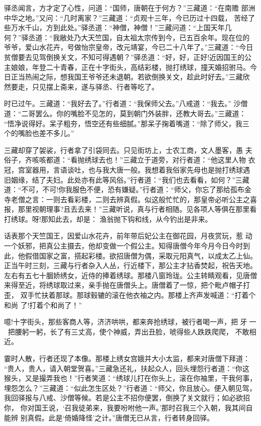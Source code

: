 驿丞闻言，方才定了心性，问道：“国师，唐朝在于何方？”三藏道：“在南赡
部洲中华之地。”又问：“几时离家？”三藏道：“贞观十三年，今已历过十四载，
苦经了些万水千山，方到此处。”驿丞道：“神僧，神僧！”三藏问道：“上国天年几
何？”驿丞道：“我敝处乃大天竺国，自太祖太宗传到今，已五百余年。现在位的
爷爷，爱山水花卉，号做怡宗皇帝，改元靖宴，今已二十八年了。”三藏道：“今日
贫僧要去见驾倒换关文，不知可得遇朝？”驿丞道：“好，好，正好!近因国王的公
主娘娘，年登二十青春，正在十字街头，高结彩楼，抛打绣球，撞天婚招驸马。今
日正当热闹之际，想我国王爷爷还未退朝。若欲倒换关文，趁此时好去。”三藏欣
然要走，只见摆上斋来，遂与驿丞、行者等吃了。

时已过午。三藏道：“我好去了。”行者道：“我保师父去。”八戒道：“我去。”
沙僧道：“二哥罢么。你的嘴脸不见怎的，莫到朝门外装胖，还教大哥去。”三藏道：
“悟净说得好。呆子粗夯，悟空还有些细腻。”那呆子掬着嘴道：“除了师父，我三
个的嘴脸也差不多儿。”

三藏却穿了袈裟，行者拿了引袋同去。只见街坊上，士农工商，文人墨客，愚
夫俗子，齐咳咳都道：“看抛绣球去也！”三藏立于道旁，对行者道：“他这里人物
衣冠，宫室器用，言语谈吐，也与我大唐一般。我想着我俗家先母也是抛打绣球遇
旧姻缘，结了夫妇。此处亦有此等风俗。”行者道：“我们也去看看，如何？”三藏
道：“不可，不可!你我服色不便，恐有嫌疑。”行者道：“师父，你忘了那给孤布金
寺老僧之言：一则去看彩楼，二则去辨真假。似这般忙忙的，那皇帝必听公主之喜
报，那里视朝理事?且去去来！”三藏听说，真与行者相随。见各项人等俱在那里看
打绣球。呀!那知此去，却是：
渔翁抛下钩和线，从今钓出是非来。

话表那个天竺国王，因爱山水花卉，前年带后妃公主在御花园，月夜赏玩，惹
动一个妖邪，把真公主摄去，他却变做一个假公主。知得唐僧今年今月今日今时到
此，他假借国家之富，搭起彩楼。欲招唐僧为偶，采取元阳真气，以成太乙上仙。
正当午时三刻，三藏与行者杂入人丛，行近楼下，那公主才拈香焚起，祝告天地。
左右有五七十胭娇绣女，近侍的捧着绣球。那楼八窗玲珑。公主转睛观看，见唐僧
来得至近，将绣球取过来，亲手抛在唐僧头上。唐僧着了一惊，把个毗卢帽子打歪，
双手忙扶着那球。那球毂辘的滚在他衣袖之内。那楼上齐声发喊道：“打着个和尚
了!打着个和尚了！”

噫!十字街头，那些客商人等，济济哄哄，都来奔抢绣球，被行者喝一声，把
牙一，把腰躬一躬，长了有三丈高，使个神威，弄出丑脸，唬得些人跌跌爬爬，
不敢相近。

霎时人散，行者还现了本像。那楼上绣女宫娥并大小太监，都来对唐僧下拜道：
“贵人，贵人，请入朝堂贺喜。”三藏急还礼，扶起众人，回头埋怨行者道：“你这
猴头，又是撮弄我也！”行者笑道：“绣球儿打在你头上，滚在你袖里，干我何事，
埋怨怎么？”三藏道：“似此怎生区处？”行者道：“师父，你且放心。便入朝见驾，
我回驿报与八戒、沙僧等候。若是公主不招你便罢，倒换了关文就行；如必欲招你，
你对国王说，‘召我徒弟来，我要吩咐他一声。’那时召我三个入朝，我其间自能辨
别真假。此是‘倚婚降怪’之计。”唐僧无已从言，行者转身回驿。


